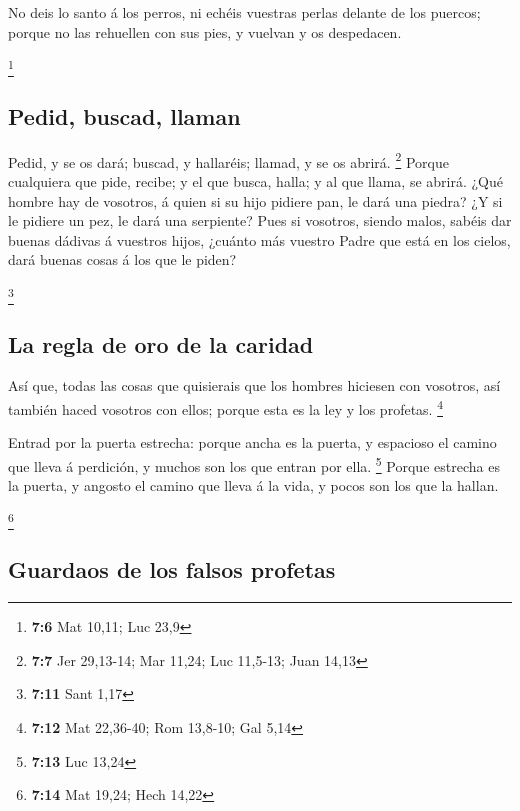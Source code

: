  No deis lo santo á los perros, ni echéis vuestras perlas
delante de los puercos; porque no las rehuellen con sus pies, y vuelvan
y os despedacen.

\footnote{\textbf{7:6} Mat 10,11; Luc 23,9}

\hypertarget{pedid-buscad-llaman}{%
\subsection{Pedid, buscad, llaman}\label{pedid-buscad-llaman}}

 Pedid, y se os dará; buscad, y hallaréis; llamad, y se os
abrirá. \footnote{\textbf{7:7} Jer 29,13-14; Mar 11,24; Luc 11,5-13;
  Juan 14,13}  Porque cualquiera que pide, recibe; y el que
busca, halla; y al que llama, se abrirá.  ¿Qué hombre hay de
vosotros, á quien si su hijo pidiere pan, le dará una piedra?
 ¿Y si le pidiere un pez, le dará una serpiente?
 Pues si vosotros, siendo malos, sabéis dar buenas dádivas
á vuestros hijos, ¿cuánto más vuestro Padre que está en los cielos, dará
buenas cosas á los que le piden?

\footnote{\textbf{7:11} Sant 1,17}

\hypertarget{la-regla-de-oro-de-la-caridad}{%
\subsection{La regla de oro de la
caridad}\label{la-regla-de-oro-de-la-caridad}}

 Así que, todas las cosas que quisierais que los hombres
hiciesen con vosotros, así también haced vosotros con ellos; porque esta
es la ley y los profetas. \footnote{\textbf{7:12} Mat 22,36-40; Rom
  13,8-10; Gal 5,14}

 Entrad por la puerta estrecha: porque ancha es la puerta,
y espacioso el camino que lleva á perdición, y muchos son los que entran
por ella. \footnote{\textbf{7:13} Luc 13,24}  Porque
estrecha es la puerta, y angosto el camino que lleva á la vida, y pocos
son los que la hallan.

\footnote{\textbf{7:14} Mat 19,24; Hech 14,22}

\hypertarget{guardaos-de-los-falsos-profetas}{%
\subsection{Guardaos de los falsos
profetas}\label{guardaos-de-los-falsos-profetas}}

